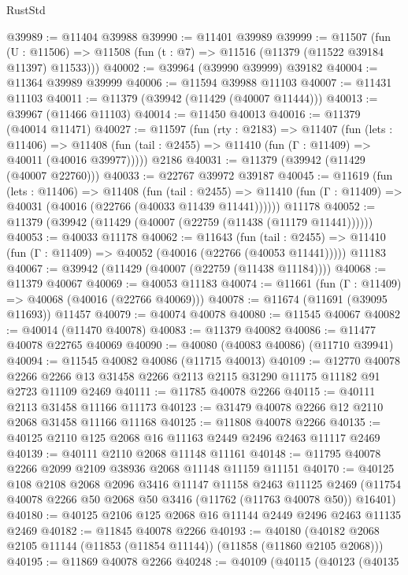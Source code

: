 \begin{lexlean}{RustStd}
\begin{coremodule}
@39989 := @11404 @39988
@39990 := @11401 @39989
@39999 := @11507
    (fun (U : @11506) => @11508 (fun (t : @7) => @11516 (@11379 (@11522 @39184 @11397) @11533)))
@40002 := @39964 (@39990 @39999) @39182
@40004 := @11364 @39989 @39999
@40006 := @11594 @39988 @11103
@40007 := @11431 @11103
@40011 := @11379 (@39942 (@11429 (@40007 @11444)))
@40013 := @39967 (@11466 @11103)
@40014 := @11450 @40013
@40016 := @11379 (@40014 @11471)
@40027 := @11597
    (fun (rty : @2183) =>
    @11407
      (fun (lets : @11406) =>
      @11408 (fun (tail : @2455) => @11410 (fun (Γ : @11409) => @40011 (@40016 @39977)))))
    @2186
@40031 := @11379 (@39942 (@11429 (@40007 @22760)))
@40033 := @22767 @39972 @39187
@40045 := @11619
    (fun (lets : @11406) =>
    @11408
      (fun (tail : @2455) =>
      @11410 (fun (Γ : @11409) => @40031 (@40016 (@22766 (@40033 @11439 @11441))))))
    @11178
@40052 := @11379 (@39942 (@11429 (@40007 (@22759 (@11438 (@11179 @11441))))))
@40053 := @40033 @11178
@40062 := @11643
    (fun (tail : @2455) => @11410 (fun (Γ : @11409) => @40052 (@40016 (@22766 (@40053 @11441)))))
    @11183
@40067 := @39942 (@11429 (@40007 (@22759 (@11438 @11184))))
@40068 := @11379 @40067
@40069 := @40053 @11183
@40074 := @11661 (fun (Γ : @11409) => @40068 (@40016 (@22766 @40069)))
@40078 := @11674 (@11691 (@39095 @11693)) @11457
@40079 := @40074 @40078
@40080 := @11545 @40067
@40082 := @40014 (@11470 @40078)
@40083 := @11379 @40082
@40086 := @11477 @40078 @22765 @40069
@40090 := @40080 (@40083 @40086) (@11710 @39941)
@40094 := @11545 @40082 @40086 (@11715 @40013)
@40109 := @12770
    @40078
    @2266
    @2266
    @13
    @31458
    @2266
    @2113
    @2115
    @31290
    @11175
    @11182
    @91
    @2723
    @11109
    @2469
@40111 := @11785 @40078 @2266
@40115 := @40111 @2113 @31458 @11166 @11173
@40123 := @31479 @40078 @2266 @12 @2110 @2068 @31458 @11166 @11168
@40125 := @11808 @40078 @2266
@40135 := @40125 @2110 @125 @2068 @16 @11163 @2449 @2496 @2463 @11117 @2469
@40139 := @40111 @2110 @2068 @11148 @11161
@40148 := @11795 @40078 @2266 @2099 @2109 @38936 @2068 @11148 @11159 @11151
@40170 := @40125
    @108
    @2108
    @2068
    @2096
    @3416
    @11147
    @11158
    @2463
    @11125
    @2469
    (@11754 @40078 @2266 @50 @2068 @50 @3416 (@11762 (@11763 @40078 @50)) @16401)
@40180 := @40125 @2106 @125 @2068 @16 @11144 @2449 @2496 @2463 @11135 @2469
@40182 := @11845 @40078 @2266
@40193 := @40180 (@40182 @2068 @2105 @11144 (@11853 (@11854 @11144)) (@11858 (@11860 @2105 @2068)))
@40195 := @11869 @40078 @2266
@40248 := @40109
    (@40115
      (@40123
        (@40135

\end{coremodule}
\end{lexlean}
